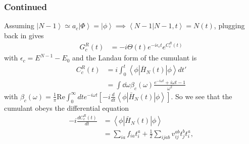 \begin{frame}
    \frametitle{Continued}
Assuming
$\left| N-1 \right> \simeq a_c \left| \Phi \right> = \left| \phi \right> \implies \left<N-1\right| \left. N-1, t \right> = N(t)$, plugging back in gives
\begin{align}
    G_c^R(t) &= -i \Theta(t) e^{-i \epsilon_c t} e^{C_c^R(t)}
\end{align}
with $\epsilon_c = E^{N-1} - E_0$ and the Landau form of the cumulant is
\begin{align}
C_c^R(t) &= i \int_0^t \left< \phi \left| \bar{H}_N(t) \right| \phi\right> dt' \\   
&= \int \dd \omega \beta_c(\omega) \frac{e^{-i\omega t} + i\omega t - 1}{\omega^2} 
\end{align}
with $\beta_c(\omega) = \frac{1}{\pi} \mathrm{Re} \int_0^{\infty} dt e^{-i\omega t} \left[-i \frac{d}{dt} \left< \phi \left| \bar{H}_N(t) \right| \phi \right> \right]$.
So we see that the cumulant obeys the differential equation
\begin{equation}
\label{eqn:matel1}
\begin{split}
-i\frac{d C_c^R(t)}{dt} &= \left< \phi \left| \bar{H}_N(t) \right| \phi \right> \\
&= \sum_{ia} f_{ia} t_i^a +
\frac{1}{2} \sum_{ijab} v_{ij}^{ab} t_j^b t_i^a,
\end{split}
\end{equation}
\end{frame}